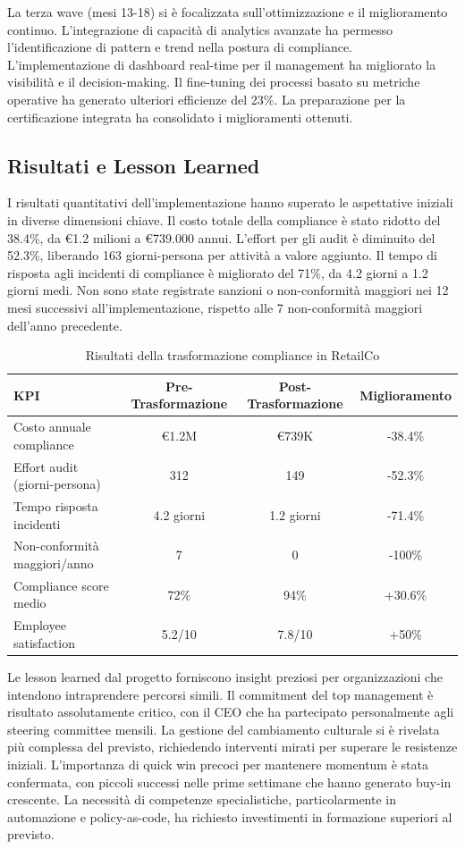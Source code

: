 La terza wave (mesi 13-18) si è focalizzata sull'ottimizzazione e il miglioramento continuo. L'integrazione di capacità di analytics avanzate ha permesso l'identificazione di pattern e trend nella postura di compliance. L'implementazione di dashboard real-time per il management ha migliorato la visibilità e il decision-making. Il fine-tuning dei processi basato su metriche operative ha generato ulteriori efficienze del 23\%. La preparazione per la certificazione integrata ha consolidato i miglioramenti ottenuti.

\subsection{Risultati e Lesson Learned}

I risultati quantitativi dell'implementazione hanno superato le aspettative iniziali in diverse dimensioni chiave. Il costo totale della compliance è stato ridotto del 38.4\%, da €1.2 milioni a €739.000 annui. L'effort per gli audit è diminuito del 52.3\%, liberando 163 giorni-persona per attività a valore aggiunto. Il tempo di risposta agli incidenti di compliance è migliorato del 71\%, da 4.2 giorni a 1.2 giorni medi. Non sono state registrate sanzioni o non-conformità maggiori nei 12 mesi successivi all'implementazione, rispetto alle 7 non-conformità maggiori dell'anno precedente.

\begin{table}[h]
\centering
\caption{Risultati della trasformazione compliance in RetailCo}
\label{tab:risultati_retailco}
\begin{tabular}{|l|c|c|c|}
\hline
\textbf{KPI} & \textbf{Pre-Trasformazione} & \textbf{Post-Trasformazione} & \textbf{Miglioramento} \\
\hline
Costo annuale compliance & €1.2M & €739K & -38.4\% \\
Effort audit (giorni-persona) & 312 & 149 & -52.3\% \\
Tempo risposta incidenti & 4.2 giorni & 1.2 giorni & -71.4\% \\
Non-conformità maggiori/anno & 7 & 0 & -100\% \\
Compliance score medio & 72\% & 94\% & +30.6\% \\
Employee satisfaction & 5.2/10 & 7.8/10 & +50\% \\
\hline
\end{tabular}
\end{table}

Le lesson learned dal progetto forniscono insight preziosi per organizzazioni che intendono intraprendere percorsi simili. Il commitment del top management è risultato assolutamente critico, con il CEO che ha partecipato personalmente agli steering committee mensili. La gestione del cambiamento culturale si è rivelata più complessa del previsto, richiedendo interventi mirati per superare le resistenze iniziali. L'importanza di quick win precoci per mantenere momentum è stata confermata, con piccoli successi nelle prime settimane che hanno generato buy-in crescente. La necessità di competenze specialistiche, particolarmente in automazione e policy-as-code, ha richiesto investimenti in formazione superiori al previsto.


